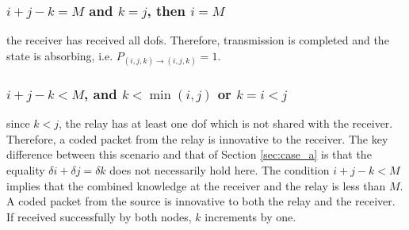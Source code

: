 \subsubsection{$i+j-k=M$ and $k=j$, then $i=M$} the receiver has received all dofs. Therefore, transmission is completed and the state is absorbing, i.e. $P_{(i,j,k) \rightarrow (i, j, k)} = 1$.

\subsubsection{$i+j-k <M$, and $k < \min(i,j)$ or $k = i < j$} since $k<j$, the relay has at least one dof which is not shared with the receiver. Therefore, a coded packet from the relay is innovative to the receiver. The key difference between this scenario and that of Section \ref{sec:case_a} is that the equality $\delta i + \delta j = \delta k$ does not necessarily hold here. The condition $i + j - k< M$ implies that the combined knowledge at the receiver and the relay is less than $M$. A coded packet from the source is innovative to both the relay and the receiver. If received successfully by both nodes, $k$ increments by one.

